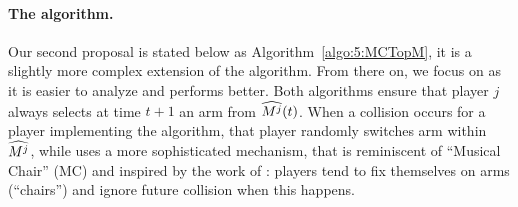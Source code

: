 \paragraph{The \MCTopM{} algorithm.}
%
Our second proposal \MCTopM{} is stated below as Algorithm~\ref{algo:5:MCTopM},
it is a slightly more complex extension of the \RandTopM{} algorithm.
From there on, we focus on \MCTopM{} as it is easier to analyze and performs better.
%
Both algorithms ensure that player $j$ always
selects at time $t+1$ an arm from $\widehat{M^j}(t)$.
When a collision occurs for a player implementing the \RandTopM{} algorithm, that player randomly switches arm within $\widehat{M^j}$, while \MCTopM{} uses a more sophisticated mechanism, that is reminiscent of ``Musical Chair'' (MC) and inspired by the work of \cite{Rosenski16}: players tend to fix themselves on arms (``chairs'') and ignore future collision when this happens.



